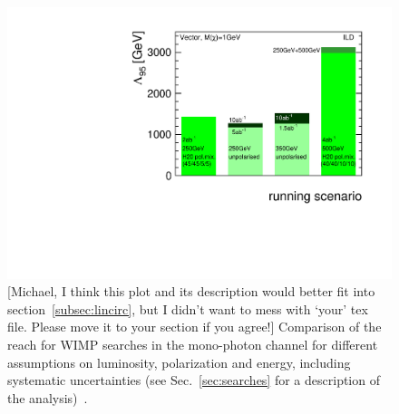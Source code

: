 \begin{figure}
\centering
\includegraphics[width=0.95\linewidth]{./chapters/figures/manhattan_vector_v3.pdf}
		
\caption{{\color{red}[Michael, I think this plot and its description would better fit into section~\ref{subsec:lincirc}, but I didn't want to mess with `your' tex file. Please move it to your section if you agree!]} Comparison of the reach for WIMP searches in the mono-photon channel for different assumptions on luminosity, polarization and energy, including systematic uncertainties (see Sec.~\ref{sec:searches} for a description of the analysis)~\cite{Habermehl:417605}. }
\label{fig:polWIMPmanhattans}
\end{figure}




